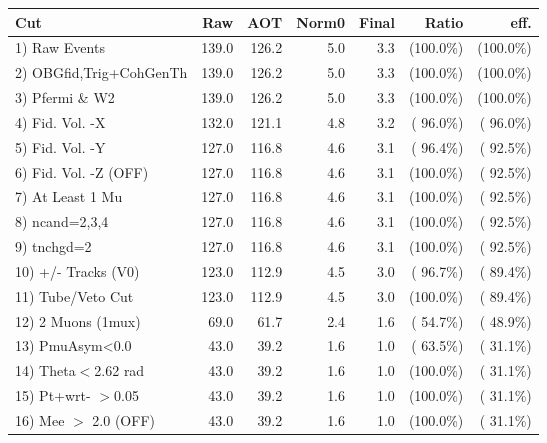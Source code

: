  \begin{table}[h!]\centering
 \begin{tabular}{||l||r|r|r|r|r|r||}
 \hline
 \hline
 Cut & Raw & AOT & Norm0 & Final & Ratio & eff.       \\
 \hline
  1) Raw Events           &        139.0 &        126.2 &          5.0 &          3.3 & (100.0\%) & (100.0\%) \\
  2) OBGfid,Trig+CohGenTh &        139.0 &        126.2 &          5.0 &          3.3 & (100.0\%) & (100.0\%) \\
  3) Pfermi \& W2         &        139.0 &        126.2 &          5.0 &          3.3 & (100.0\%) & (100.0\%) \\
  4) Fid. Vol. -X         &        132.0 &        121.1 &          4.8 &          3.2 & ( 96.0\%) & ( 96.0\%) \\
  5) Fid. Vol. -Y         &        127.0 &        116.8 &          4.6 &          3.1 & ( 96.4\%) & ( 92.5\%) \\
  6) Fid. Vol. -Z (OFF)   &        127.0 &        116.8 &          4.6 &          3.1 & (100.0\%) & ( 92.5\%) \\
  7) At Least 1 Mu        &        127.0 &        116.8 &          4.6 &          3.1 & (100.0\%) & ( 92.5\%) \\
  8) ncand=2,3,4          &        127.0 &        116.8 &          4.6 &          3.1 & (100.0\%) & ( 92.5\%) \\
  9) tnchgd=2             &        127.0 &        116.8 &          4.6 &          3.1 & (100.0\%) & ( 92.5\%) \\
 10) +/- Tracks (V0)      &        123.0 &        112.9 &          4.5 &          3.0 & ( 96.7\%) & ( 89.4\%) \\
 11) Tube/Veto Cut        &        123.0 &        112.9 &          4.5 &          3.0 & (100.0\%) & ( 89.4\%) \\
 12) 2 Muons (1mux)       &         69.0 &         61.7 &          2.4 &          1.6 & ( 54.7\%) & ( 48.9\%) \\
 13) PmuAsym<0.0          &         43.0 &         39.2 &          1.6 &          1.0 & ( 63.5\%) & ( 31.1\%) \\
 14) Theta$<$2.62 rad     &         43.0 &         39.2 &          1.6 &          1.0 & (100.0\%) & ( 31.1\%) \\
 15) Pt+wrt- $>$0.05      &         43.0 &         39.2 &          1.6 &          1.0 & (100.0\%) & ( 31.1\%) \\
 16) Mee $>$ 2.0  (OFF)   &         43.0 &         39.2 &          1.6 &          1.0 & (100.0\%) & ( 31.1\%) \\

\end{tabular}
\end{table}
